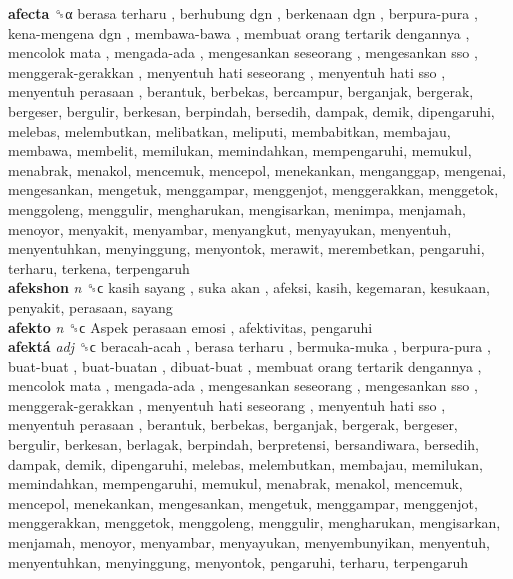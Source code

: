 \textbf{afecta} ␝α   berasa terharu ,  berhubung dgn ,  berkenaan dgn ,  berpura-pura ,  kena-mengena dgn ,  membawa-bawa ,  membuat orang tertarik dengannya ,  mencolok mata ,  mengada-ada ,  mengesankan seseorang ,  mengesankan sso ,  menggerak-gerakkan ,  menyentuh hati seseorang ,  menyentuh hati sso ,  menyentuh perasaan , berantuk, berbekas, bercampur, berganjak, bergerak, bergeser, bergulir, berkesan, berpindah, bersedih, dampak, demik, dipengaruhi, melebas, melembutkan, melibatkan, meliputi, membabitkan, membajau, membawa, membelit, memilukan, memindahkan, mempengaruhi, memukul, menabrak, menakol, mencemuk, mencepol, menekankan, menganggap, mengenai, mengesankan, mengetuk, menggampar, menggenjot, menggerakkan, menggetok, menggoleng, menggulir, mengharukan, mengisarkan, menimpa, menjamah, menoyor, menyakit, menyambar, menyangkut, menyayukan, menyentuh, menyentuhkan, menyinggung, menyontok, merawit, merembetkan, pengaruhi, terharu, terkena, terpengaruh  \\
\textbf{afekshon} \emph{n}  ␝ϲ   kasih sayang ,  suka akan , afeksi, kasih, kegemaran, kesukaan, penyakit, perasaan, sayang  \\
\textbf{afekto} \emph{n}  ␝ϲ   Aspek perasaan emosi , afektivitas, pengaruhi  \\
\textbf{afektá} \emph{adj}  ␝ϲ   beracah-acah ,  berasa terharu ,  bermuka-muka ,  berpura-pura ,  buat-buat ,  buat-buatan ,  dibuat-buat ,  membuat orang tertarik dengannya ,  mencolok mata ,  mengada-ada ,  mengesankan seseorang ,  mengesankan sso ,  menggerak-gerakkan ,  menyentuh hati seseorang ,  menyentuh hati sso ,  menyentuh perasaan , berantuk, berbekas, berganjak, bergerak, bergeser, bergulir, berkesan, berlagak, berpindah, berpretensi, bersandiwara, bersedih, dampak, demik, dipengaruhi, melebas, melembutkan, membajau, memilukan, memindahkan, mempengaruhi, memukul, menabrak, menakol, mencemuk, mencepol, menekankan, mengesankan, mengetuk, menggampar, menggenjot, menggerakkan, menggetok, menggoleng, menggulir, mengharukan, mengisarkan, menjamah, menoyor, menyambar, menyayukan, menyembunyikan, menyentuh, menyentuhkan, menyinggung, menyontok, pengaruhi, terharu, terpengaruh  \\
